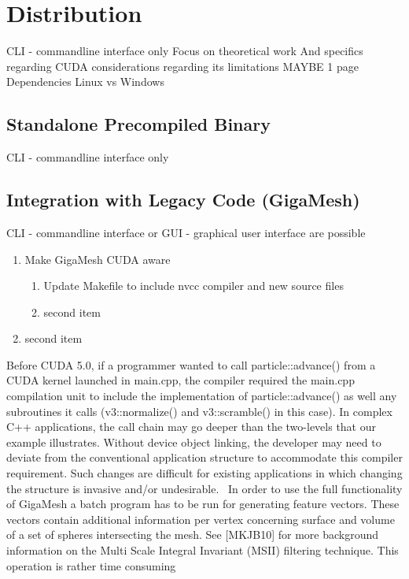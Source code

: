 \chapter{Distribution}
CLI - commandline interface only
Focus on theoretical work 
And specifics regarding CUDA considerations regarding its limitations
MAYBE 1 page
Dependencies
Linux vs Windows



\section{Standalone Precompiled Binary}
CLI - commandline interface only



\section{Integration with Legacy Code (GigaMesh)}
CLI - commandline interface or GUI - graphical user interface are possible
\begin{enumerate}
\item Make GigaMesh CUDA aware
	\begin{enumerate}
	\item Update Makefile to include nvcc compiler and new source files
	\item second item
	\end{enumerate}
\item second item
\end{enumerate}
Before CUDA 5.0, if a programmer wanted to call particle::advance() from a CUDA 
kernel launched in main.cpp, the compiler required the main.cpp compilation unit 
to include the implementation of particle::advance() as well any subroutines it 
calls (v3::normalize() and v3::scramble() in this case). In complex C++ 
applications, the call chain may go deeper than the two-levels that our example 
illustrates. Without device object linking, the developer may need to deviate 
from the conventional application structure to accommodate this compiler 
requirement. Such changes are difficult for existing applications in which 
changing the structure is invasive and/or undesirable.~\cite{Cuda14}
In order to use the full functionality of GigaMesh a batch program has to be run 
for generating feature vectors. These vectors contain additional information per 
vertex concerning surface and volume of a set of spheres intersecting the mesh. 
See [MKJB10] for more background information on the Multi Scale Integral 
Invariant (MSII) filtering technique. This operation is rather time consuming 
